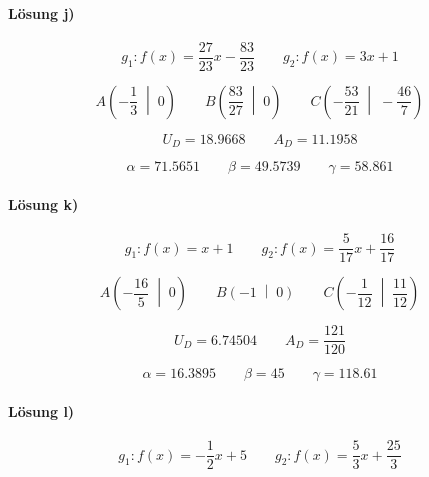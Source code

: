 \paragraph{Lösung j)}
\begin{equation*}
  g_1:f(x)=\frac{\num{27}}{\num{23}}x-\frac{\num{83}}{\num{23}}
  \qquad
  g_2:f(x)=\num{3}x+\num{1}
\end{equation*}

\begin{equation*}
  A\left(-\frac{\num{1}}{\num{3}}\;\middle|\;\num{0}\right)
  \qquad
  B\left(\frac{\num{83}}{\num{27}}\;\middle|\;\num{0}\right)
  \qquad
  C\left(-\frac{\num{53}}{\num{21}}\;\middle|\;-\frac{\num{46}}{\num{7}}\right)
\end{equation*}

\begin{equation*}
  U_D=\num{18.9668}
  \qquad
  A_D=\num{11.1958}
\end{equation*}

\begin{equation*}
  \alpha=\num{71.5651}
  \qquad
  \beta=\num{49.5739}
  \qquad
  \gamma=\num{58.861}
\end{equation*}

\paragraph{Lösung k)}
\begin{equation*}
  g_1:f(x)=x+\num{1}
  \qquad
  g_2:f(x)=\frac{\num{5}}{\num{17}}x+\frac{\num{16}}{\num{17}}
\end{equation*}

\begin{equation*}
  A\left(-\frac{\num{16}}{\num{5}}\;\middle|\;\num{0}\right)
  \qquad
  B\left(\num{-1}\;\middle|\;\num{0}\right)
  \qquad
  C\left(-\frac{\num{1}}{\num{12}}\;\middle|\;\frac{\num{11}}{\num{12}}\right)
\end{equation*}

\begin{equation*}
  U_D=\num{6.74504}
  \qquad
  A_D=\frac{\num{121}}{\num{120}}
\end{equation*}

\begin{equation*}
  \alpha=\num{16.3895}
  \qquad
  \beta=\num{45}
  \qquad
  \gamma=\num{118.61}
\end{equation*}

\paragraph{Lösung l)}
\begin{equation*}
  g_1:f(x)=-\frac{\num{1}}{\num{2}}x+\num{5}
  \qquad
  g_2:f(x)=\frac{\num{5}}{\num{3}}x+\frac{\num{25}}{\num{3}}
\end{equation*}

